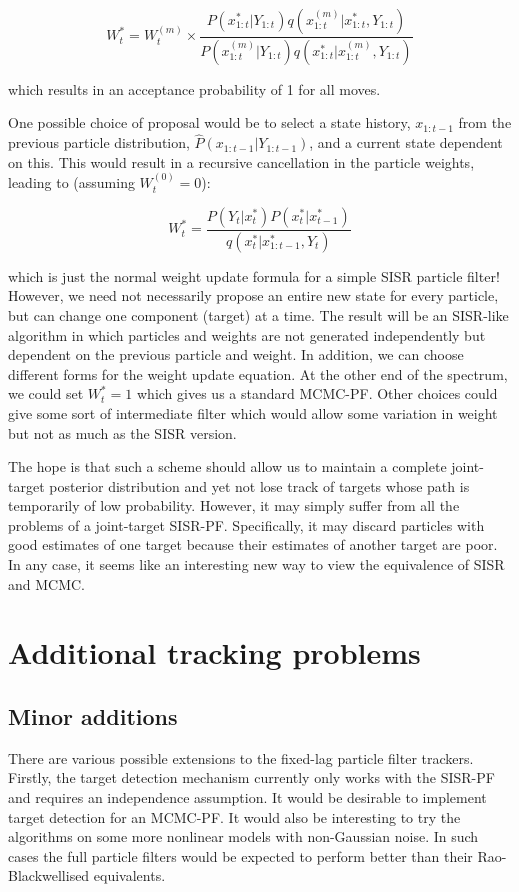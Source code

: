 \begin{equation}
W_t^{*} = W_t^{(m)} \times \frac{P(x_{1:t}^{*}|Y_{1:t})q(x_{1:t}^{(m)}|x_{1:t}^{*}, Y_{1:t})}{P(x_{1:t}^{(m)}|Y_{1:t})q(x_{1:t}^{*}|x_{1:t}^{(m)}, Y_{1:t})}
\end{equation}

which results in an acceptance probability of 1 for all moves.

One possible choice of proposal would be to select a state history, $x_{1:t-1}$ from the previous particle distribution, $\hat{P}(x_{1:t-1}|Y_{1:t-1})$, and a current state dependent on this. This would result in a recursive cancellation in the particle weights, leading to (assuming $W_t^{(0)}=0$):

\begin{equation}
W_t^{*} = \frac{P(Y_t|x_t^{*})P(x_t^{*}|x_{t-1}^{*})}{q(x_{t}^{*}|x_{1:t-1}^{*}, Y_{t})}
\end{equation}

which is just the normal weight update formula for a simple SISR particle filter! However, we need not necessarily propose an entire new state for every particle, but can change one component (target) at a time. The result will be an SISR-like algorithm in which particles and weights are not generated independently but dependent on the previous particle and weight. In addition, we can choose different forms for the weight update equation. At the other end of the spectrum, we could set $W_t^{*}=1$ which gives us a standard MCMC-PF. Other choices could give some sort of intermediate filter which would allow some variation in weight but not as much as the SISR version.

The hope is that such a scheme should allow us to maintain a complete joint-target posterior distribution and yet not lose track of targets whose path is temporarily of low probability. However, it may simply suffer from all the problems of a joint-target SISR-PF. Specifically, it may discard particles with good estimates of one target because their estimates of another target are poor. In any case, it seems like an interesting new way to view the equivalence of SISR and MCMC.



\section{Additional tracking problems}

\subsection{Minor additions}
There are various possible extensions to the fixed-lag particle filter trackers. Firstly, the target detection mechanism currently only works with the SISR-PF and requires an independence assumption. It would be desirable to implement target detection for an MCMC-PF. It would also be interesting to try the algorithms on some more nonlinear models with non-Gaussian noise. In such cases the full particle filters would be expected to perform better than their Rao-Blackwellised equivalents.

